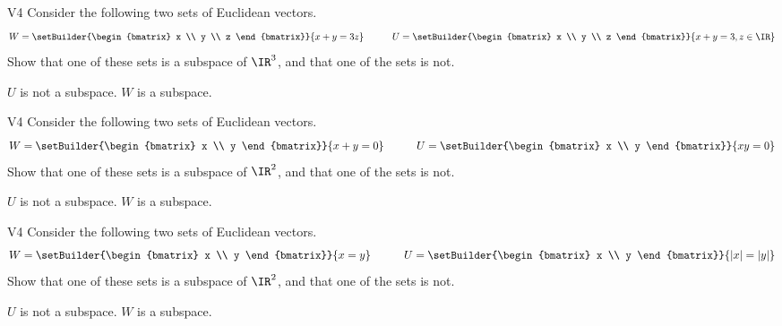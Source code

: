 \begin{problem}{V4}
Consider the following two sets of Euclidean vectors.
\[
  W = \setBuilder{\begin{bmatrix} x \\ y \\ z \end{bmatrix}}{x+y=3z}
\hspace{3em}
  U = \setBuilder{\begin{bmatrix} x \\ y \\ z \end{bmatrix}}{x+y=3,z\in\IR}
\]
Show that one of these sets is a subspace of \(\IR^3\), and
that one of the sets is not.
\end{problem}
\begin{solution}
\(U\) is not a subspace.  \(W\) is a subspace.
\end{solution}

\begin{problem}{V4}
Consider the following two sets of Euclidean vectors.
\[
  W = \setBuilder{\begin{bmatrix} x \\ y \end{bmatrix}}{x+y=0}
\hspace{3em}
  U = \setBuilder{\begin{bmatrix} x \\ y \end{bmatrix}}{xy=0}
\]
Show that one of these sets is a subspace of \(\IR^2\), and
that one of the sets is not.
\end{problem}
\begin{solution}
\(U\) is not a subspace.  \(W\) is a subspace.
\end{solution}

\begin{problem}{V4}
Consider the following two sets of Euclidean vectors.
\[
  W = \setBuilder{\begin{bmatrix} x \\ y \end{bmatrix}}{x=y}
\hspace{3em}
  U = \setBuilder{\begin{bmatrix} x \\ y \end{bmatrix}}{|x|=|y|}
\]
Show that one of these sets is a subspace of \(\IR^2\), and
that one of the sets is not.
\end{problem}
\begin{solution}
\(U\) is not a subspace.  \(W\) is a subspace.
\end{solution}

